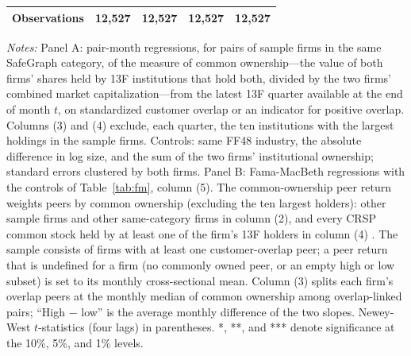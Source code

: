 \begin{table}[!htbp]
\begin{tabular*}{\linewidth}{@{\extracolsep{\fill}}lcccc}
Observations & 12,527 & 12,527 & 12,527 & 12,527 \\
\bottomrule
\end{tabular*}
\par\vspace{4pt}\begin{minipage}{\linewidth}\scriptsize \emph{Notes:} Panel A: pair-month regressions, for pairs of sample firms in the same SafeGraph category, of the \citet{AntonPolk2014} measure of common ownership---the value of both firms' shares held by 13F institutions that hold both, divided by the two firms' combined market capitalization---from the latest 13F quarter available at the end of month $t$, on standardized customer overlap or an indicator for positive overlap. Columns (3) and (4) exclude, each quarter, the ten institutions with the largest holdings in the sample firms. Controls: same FF48 industry, the absolute difference in log size, and the sum of the two firms' institutional ownership; standard errors clustered by both firms. Panel B: Fama-MacBeth regressions with the controls of Table~\ref{tab:fm}, column (5). The common-ownership peer return weights peers by common ownership (excluding the ten largest holders): other sample firms and other same-category firms in column (2), and every CRSP common stock held by at least one of the firm's 13F holders in column (4) \citep{AntonPolk2014,Ying2024}. The sample consists of firms with at least one customer-overlap peer; a peer return that is undefined for a firm (no commonly owned peer, or an empty high or low subset) is set to its monthly cross-sectional mean. Column (3) splits each firm's overlap peers at the monthly median of common ownership among overlap-linked pairs; ``High $-$ low'' is the average monthly difference of the two slopes. Newey-West $t$-statistics (four lags) in parentheses. *, **, and *** denote significance at the 10\%, 5\%, and 1\% levels.\end{minipage}
\end{table}